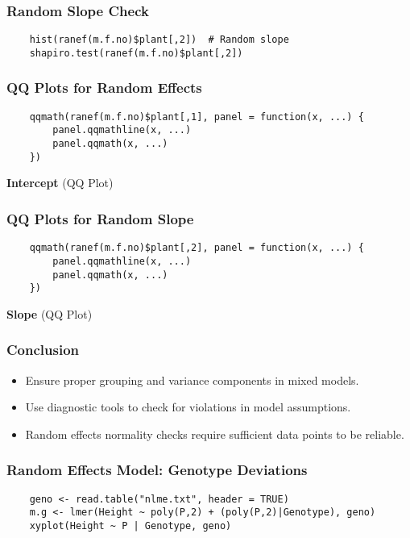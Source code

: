 \documentclass{beamer}
\begin{document}
\begin{frame}[fragile]
    \frametitle{Random Slope Check}
    \lstset{style=Rstyle}
    \begin{lstlisting}
    hist(ranef(m.f.no)$plant[,2])  # Random slope
    shapiro.test(ranef(m.f.no)$plant[,2])
    \end{lstlisting}
\end{frame}

\begin{frame}[fragile]
    \frametitle{QQ Plots for Random Effects}
    \lstset{style=Rstyle}
    \begin{lstlisting}
    qqmath(ranef(m.f.no)$plant[,1], panel = function(x, ...) {
        panel.qqmathline(x, ...)
        panel.qqmath(x, ...)
    })
    \end{lstlisting}
    \textbf{Intercept} (QQ Plot)
\end{frame}

\begin{frame}[fragile]
    \frametitle{QQ Plots for Random Slope}
    \lstset{style=Rstyle}
    \begin{lstlisting}
    qqmath(ranef(m.f.no)$plant[,2], panel = function(x, ...) {
        panel.qqmathline(x, ...)
        panel.qqmath(x, ...)
    })
    \end{lstlisting}
    \textbf{Slope} (QQ Plot)
\end{frame}

\begin{frame}
    \frametitle{Conclusion}
    \begin{itemize}
        \item Ensure proper grouping and variance components in mixed models.
        \item Use diagnostic tools to check for violations in model assumptions.
        \item Random effects normality checks require sufficient data points to be reliable.
    \end{itemize}
\end{frame}

\begin{frame}[fragile]
    \frametitle{Random Effects Model: Genotype Deviations}
    \lstset{style=Rstyle}
    \begin{lstlisting}
    geno <- read.table("nlme.txt", header = TRUE)
    m.g <- lmer(Height ~ poly(P,2) + (poly(P,2)|Genotype), geno)
    xyplot(Height ~ P | Genotype, geno)
    \end{lstlisting}
\end{frame}
\end{document}
